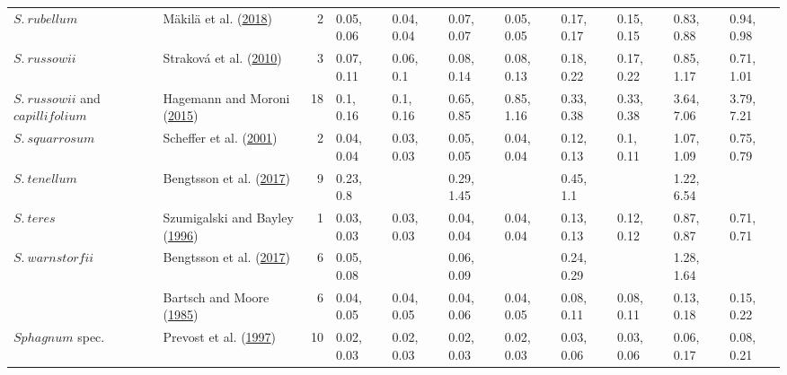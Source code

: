 \documentclass[
  12pt,
]{article}
\begin{document}
\begin{table}[H]
{\begin{tabular}[t]{llrllllllll}
\multirow[t]{-2}{*}{\raggedright\arraybackslash $S.~rubellum$} & Mäkilä et al. (\protect\hyperlink{ref-Makila.2018}{2018}) & 2 & 0.05, 0.06 & 0.04, 0.04 & 0.07, 0.07 & 0.05, 0.05 & 0.17, 0.17 & 0.15, 0.15 & 0.83, 0.88 & 0.94, 0.98\\
\cmidrule{1-11}
$S.~russowii$ & Straková et al. (\protect\hyperlink{ref-Strakova.2010}{2010}) & 3 & 0.07, 0.11 & 0.06, 0.1 & 0.08, 0.14 & 0.08, 0.13 & 0.18, 0.22 & 0.17, 0.22 & 0.85, 1.17 & 0.71, 1.01\\
\cmidrule{1-11}
$S.~russowii$ and $capillifolium$ & Hagemann and Moroni (\protect\hyperlink{ref-Hagemann.2015}{2015}) & 18 & 0.1, 0.16 & 0.1, 0.16 & 0.65, 0.85 & 0.85, 1.16 & 0.33, 0.38 & 0.33, 0.38 & 3.64, 7.06 & 3.79, 7.21\\
\cmidrule{1-11}
$S.~squarrosum$ & Scheffer et al. (\protect\hyperlink{ref-Scheffer.2001}{2001}) & 2 & 0.04, 0.04 & 0.03, 0.03 & 0.05, 0.05 & 0.04, 0.04 & 0.12, 0.13 & 0.1, 0.11 & 1.07, 1.09 & 0.75, 0.79\\
\cmidrule{1-11}
$S.~tenellum$ & Bengtsson et al. (\protect\hyperlink{ref-Bengtsson.2017}{2017}) & 9 & 0.23, 0.8 &  & 0.29, 1.45 &  & 0.45, 1.1 &  & 1.22, 6.54 & \\
\cmidrule{1-11}
$S.~teres$ & Szumigalski and Bayley (\protect\hyperlink{ref-Szumigalski.1996}{1996}) & 1 & 0.03, 0.03 & 0.03, 0.03 & 0.04, 0.04 & 0.04, 0.04 & 0.13, 0.13 & 0.12, 0.12 & 0.87, 0.87 & 0.71, 0.71\\
\cmidrule{1-11}
$S.~warnstorfii$ & Bengtsson et al. (\protect\hyperlink{ref-Bengtsson.2017}{2017}) & 6 & 0.05, 0.08 &  & 0.06, 0.09 &  & 0.24, 0.29 &  & 1.28, 1.64 & \\
\cmidrule{1-11}
 & Bartsch and Moore (\protect\hyperlink{ref-Bartsch.1985}{1985}) & 6 & 0.04, 0.05 & 0.04, 0.05 & 0.04, 0.06 & 0.04, 0.05 & 0.08, 0.11 & 0.08, 0.11 & 0.13, 0.18 & 0.15, 0.22\\

\multirow[t]{-2}{*}{\raggedright\arraybackslash $Sphagnum$ spec.} & Prevost et al. (\protect\hyperlink{ref-Prevost.1997}{1997}) & 10 & 0.02, 0.03 & 0.02, 0.03 & 0.02, 0.03 & 0.02, 0.03 & 0.03, 0.06 & 0.03, 0.06 & 0.06, 0.17 & 0.08, 0.21\\
\bottomrule
\end{tabular}}
\end{table}
\end{document}
